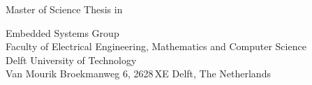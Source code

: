 
%
%
%
%

\begin{titlepage}

\begin{center}
\null\vfill
\begin{center}
\LARGE{\reportTitle}
\end{center}

\vspace{3cm}

\begin{large}
Master of Science Thesis in \reportMSC
\end{large}

\vspace{1.5cm}

\begin{normalsize}
Embedded Systems Group\\
Faculty of Electrical Engineering, Mathematics and Computer Science\\
Delft University of Technology\\
Van Mourik Broekmanweg 6, 2628\,XE Delft, The Netherlands
\end{normalsize}

\vspace{2.0cm}

\begin{normalsize}
\reportAuthor \\
\reportUrlEmailTUD \\
\reportUrlEmailNonTUD
\end{normalsize}

\vspace{1.0cm}

\reportDate

\vfill
\end{center}

\end{titlepage}
